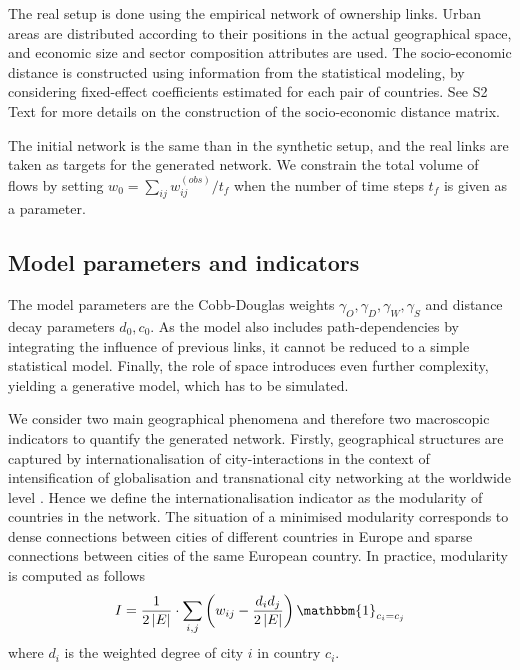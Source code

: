\documentclass[10pt,letterpaper]{article}
\begin{document}
The real setup is done using the empirical network of ownership links. Urban areas are distributed according to their positions in the actual geographical space, and economic size and sector composition attributes are used. The socio-economic distance is constructed using information from the statistical modeling, by considering fixed-effect coefficients estimated for each pair of countries. See S2 Text for more details on the construction of the socio-economic distance matrix.

The initial network is the same than in the synthetic setup, and the real links are taken as targets for the generated network. We constrain the total volume of flows by setting $w_0 = \sum_{ij} w_{ij}^{(obs)} / t_{f}$ when the number of time steps $t_f$ is given as a parameter.

\subsection*{Model parameters and indicators}

The model parameters are the Cobb-Douglas weights $\gamma_O,\gamma_D,\gamma_W,\gamma_S$ and distance decay parameters $d_0,c_0$. As the model also includes path-dependencies by integrating the influence of previous links, it cannot be reduced to a simple statistical model. Finally, the role of space introduces even further complexity, yielding a generative model, which has to be simulated.

We consider two main geographical phenomena and therefore two macroscopic indicators to quantify the generated network. Firstly, geographical structures are captured by internationalisation of city-interactions in the context of intensification of globalisation and transnational city networking at the worldwide level \cite{taylor2001specification}. Hence we define the internationalisation indicator as the modularity of countries in the network. The situation of a minimised modularity corresponds to dense connections between cities of different countries in Europe and sparse connections between cities of the same European country. In practice, modularity is computed as follows
\begin{equation}
    I = \frac{1}{2 \left|E\right|} \cdot \sum_{i,j} \left(w_{ij} - \frac{d_i d_j}{2 \left|E\right|}\right) \mathbbm{1}_{c_i = c_j}
\end{equation}
where $d_i$ is the weighted degree of city $i$ in country $c_i$.
\end{document}
